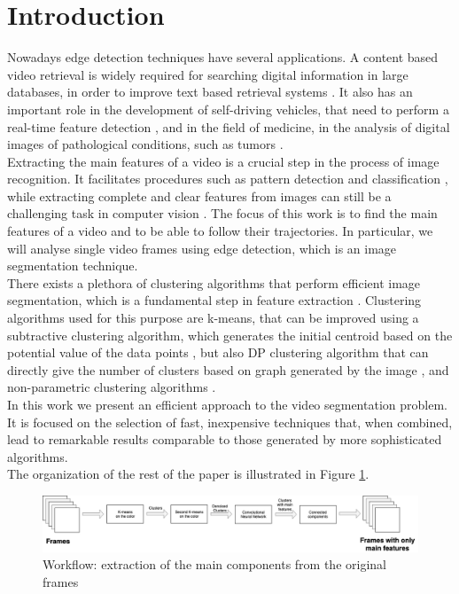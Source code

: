 \documentclass{usiinftr}
\begin{document}
\section{Introduction}
Nowadays edge detection techniques have several applications. A content based video retrieval is widely required for searching digital information in large databases, in order to improve text based retrieval systems \cite{1}. It also has an important role in the development of self-driving vehicles, that need to perform a real-time feature detection \cite{2}, and in the field of medicine, in the analysis of digital images of pathological conditions, such as tumors \cite{3}. \\
Extracting the main features of a video is a crucial step in the process of image recognition. It facilitates procedures such as pattern detection and classification \cite{4}, while extracting complete and clear features from images can still be a challenging task in computer vision \cite{5}. 
The focus of this work is to find the main features of a video and to be able to follow their trajectories. In particular, we will analyse single video frames using edge detection, which is an image segmentation technique. \\
There exists a  plethora of clustering algorithms that perform efficient image segmentation, which is a fundamental step in feature extraction \cite{6}. Clustering algorithms used for this purpose are k-means, that can be improved using a subtractive clustering algorithm, which generates the initial centroid based on the potential value of the data points \cite{7}, but also DP clustering algorithm that can directly give the number of clusters based on graph generated by the image \cite{8}, and non-parametric clustering algorithms \cite{9}. \\
In this work we present an efficient approach to the video segmentation problem. It is focused on the selection of fast, inexpensive techniques that, when combined, lead to remarkable results comparable to those generated by more sophisticated algorithms. \\
The organization of the rest of the paper is illustrated in Figure \ref{fig:small}. 
 \begin{figure}[h]
	\centering
	\includegraphics[width=0.95\linewidth]{img/smallflow}
	\caption{Workflow: extraction of the main components from the original frames}
	\label{fig:small}
\end{figure}
\end{document}
